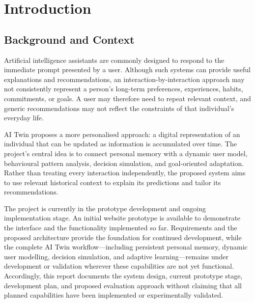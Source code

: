 \documentclass{tietreport}
\author{%
  \texttt{102403078} Lakkshya Jha \\
  \texttt{1024030713} Saksham Raj \\
  \texttt{1024030697} Noorsharn Singh%
}
\begin{document}
\let\cleardoublepage\clearpage
\maketitle
{}
\tableofcontents
\clearpage
{}

\chapter{Introduction}

\section{Background and Context}
Artificial intelligence assistants are commonly designed to respond to the immediate prompt presented by a user. Although such systems can provide useful explanations and recommendations, an interaction-by-interaction approach may not consistently represent a person's long-term preferences, experiences, habits, commitments, or goals. A user may therefore need to repeat relevant context, and generic recommendations may not reflect the constraints of that individual's everyday life.

AI Twin proposes a more personalised approach: a digital representation of an individual that can be updated as information is accumulated over time. The project's central idea is to connect personal memory with a dynamic user model, behavioural pattern analysis, decision simulation, and goal-oriented adaptation. Rather than treating every interaction independently, the proposed system aims to use relevant historical context to explain its predictions and tailor its recommendations.

The project is currently in the prototype development and ongoing implementation stage. An initial website prototype is available to demonstrate the interface and the functionality implemented so far. Requirements and the proposed architecture provide the foundation for continued development, while the complete AI Twin workflow—including persistent personal memory, dynamic user modelling, decision simulation, and adaptive learning—remains under development or validation wherever these capabilities are not yet functional. Accordingly, this report documents the system design, current prototype stage, development plan, and proposed evaluation approach without claiming that all planned capabilities have been implemented or experimentally validated.
\end{document}
